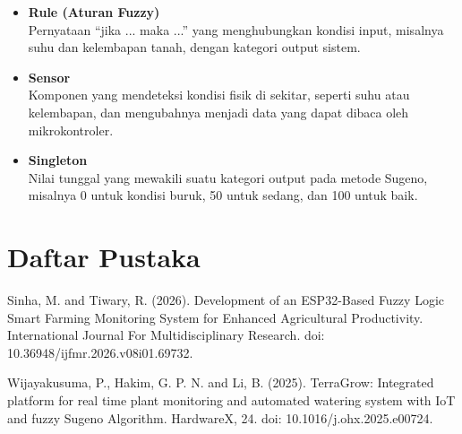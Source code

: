 \documentclass[12pt,a4paper]{article}
\begin{document}
\begin{itemize}[label={}, leftmargin=0pt, itemsep=0.35cm]
    \item \textbf{Rule (Aturan Fuzzy)}\\
    Pernyataan ``jika ... maka ...'' yang menghubungkan kondisi input, misalnya suhu dan kelembapan tanah, dengan kategori output sistem.

    \item \textbf{Sensor}\\
    Komponen yang mendeteksi kondisi fisik di sekitar, seperti suhu atau kelembapan, dan mengubahnya menjadi data yang dapat dibaca oleh mikrokontroler.

    \item \textbf{Singleton}\\
    Nilai tunggal yang mewakili suatu kategori output pada metode Sugeno, misalnya 0 untuk kondisi buruk, 50 untuk sedang, dan 100 untuk baik.
\end{itemize}

\section{Daftar Pustaka}

\noindent
\hangindent=1.2cm
Sinha, M. and Tiwary, R. (2026). Development of an ESP32-Based Fuzzy Logic Smart Farming Monitoring System for Enhanced Agricultural Productivity. International Journal For Multidisciplinary Research. doi: 10.36948/ijfmr.2026.v08i01.69732.

\vspace{0.3cm}

\noindent
\hangindent=1.2cm
Wijayakusuma, P., Hakim, G. P. N. and Li, B. (2025). TerraGrow: Integrated platform for real time plant monitoring and automated watering system with IoT and fuzzy Sugeno Algorithm. HardwareX, 24. doi: 10.1016/j.ohx.2025.e00724.
\end{document}
